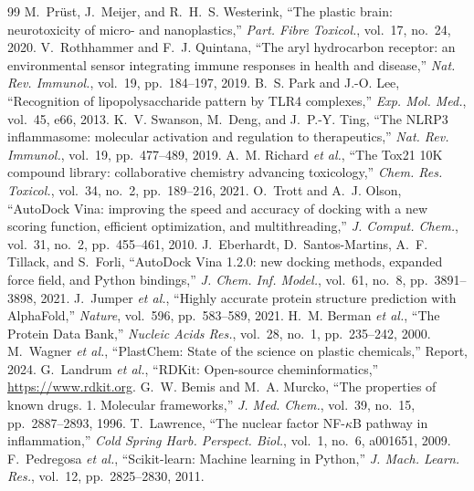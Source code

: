 \documentclass[journal]{IEEEtran}
\begin{document}
\begin{thebibliography}{99}
 M.~Pr\"ust, J.~Meijer, and R.~H.~S. Westerink, ``The plastic
brain: neurotoxicity of micro- and nanoplastics,'' \emph{Part. Fibre Toxicol.},
vol.~17, no.~24, 2020.
 V.~Rothhammer and F.~J. Quintana, ``The aryl hydrocarbon
receptor: an environmental sensor integrating immune responses in health and
disease,'' \emph{Nat. Rev. Immunol.}, vol.~19, pp.~184--197, 2019.
 B.~S. Park and J.-O. Lee, ``Recognition of lipopolysaccharide
pattern by TLR4 complexes,'' \emph{Exp. Mol. Med.}, vol.~45, e66, 2013.
 K.~V. Swanson, M.~Deng, and J.~P.-Y. Ting, ``The NLRP3
inflammasome: molecular activation and regulation to therapeutics,'' \emph{Nat.
Rev. Immunol.}, vol.~19, pp.~477--489, 2019.
 A.~M. Richard \emph{et al.}, ``The Tox21 10K compound
library: collaborative chemistry advancing toxicology,'' \emph{Chem. Res.
Toxicol.}, vol.~34, no.~2, pp.~189--216, 2021.
 O.~Trott and A.~J. Olson, ``AutoDock Vina: improving the speed
and accuracy of docking with a new scoring function, efficient optimization, and
multithreading,'' \emph{J. Comput. Chem.}, vol.~31, no.~2, pp.~455--461, 2010.
 J.~Eberhardt, D.~Santos-Martins, A.~F. Tillack, and
S.~Forli, ``AutoDock Vina 1.2.0: new docking methods, expanded force field, and
Python bindings,'' \emph{J. Chem. Inf. Model.}, vol.~61, no.~8, pp.~3891--3898,
2021.
 J.~Jumper \emph{et al.}, ``Highly accurate protein structure
prediction with AlphaFold,'' \emph{Nature}, vol.~596, pp.~583--589, 2021.
 H.~M. Berman \emph{et al.}, ``The Protein Data Bank,''
\emph{Nucleic Acids Res.}, vol.~28, no.~1, pp.~235--242, 2000.
 M.~Wagner \emph{et al.}, ``PlastChem: State of the science
on plastic chemicals,'' Report, 2024.
 G.~Landrum \emph{et al.}, ``RDKit: Open-source cheminformatics,''
\url{https://www.rdkit.org}.
 G.~W. Bemis and M.~A. Murcko, ``The properties of known drugs.
1. Molecular frameworks,'' \emph{J. Med. Chem.}, vol.~39, no.~15, pp.~2887--2893,
1996.
 T.~Lawrence, ``The nuclear factor NF-$\kappa$B pathway in
inflammation,'' \emph{Cold Spring Harb. Perspect. Biol.}, vol.~1, no.~6, a001651,
2009.
 F.~Pedregosa \emph{et al.}, ``Scikit-learn: Machine learning in
Python,'' \emph{J. Mach. Learn. Res.}, vol.~12, pp.~2825--2830, 2011.
\end{thebibliography}
\end{document}
